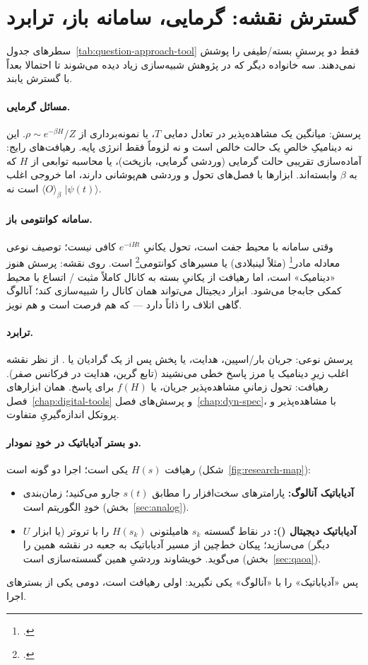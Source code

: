 \section{گسترش نقشه: گرمایی، سامانه باز، ترابرد}
\label{sec:map-extensions}

سطرهای جدول~\ref{tab:question-approach-tool} فقط دو پرسشِ بسته/طیفی را پوشش نمی‌دهند. سه خانواده دیگر که در پژوهش شبیه‌سازی زیاد دیده می‌شوند تا احتمالا بعداً با گسترش یابند.

\paragraph{مسائل گرمایی.}
پرسش: میانگین یک مشاهده‌پذیر در تعادل دمایی $T$، یا نمونه‌برداری از $\rho\sim e^{-\beta H}/Z$. این نه دینامیکِ خالصِ یک حالت خالص است و نه لزوماً فقط انرژی پایه. رهیافت‌های رایج: آماده‌سازی تقریبی حالت گرمایی (وردشی گرمایی، بازپخت)، یا محاسبه توابعی از $H$ که به $\beta$ وابسته‌اند. ابزارها با فصل‌های تحول و وردشی هم‌پوشانی دارند، اما خروجی اغلب $\langle O\rangle_\beta$ است نه $\lvert\psi(t)\rangle$.

\paragraph{سامانه کوانتومی باز.}
وقتی سامانه با محیط جفت است، تحول یکانیِ $e^{-iHt}$ کافی نیست؛ توصیف نوعی معادله مادر\footnote{.} (مثلاً لینبلادی) یا مسیرهای کوانتومی\footnote{.} است. روی نقشه: پرسش هنوز «دینامیک» است، اما رهیافت از یکانیِ بسته به کانال کاملاً مثبت / اتساع با محیط کمکی جابه‌جا می‌شود. ابزار دیجیتال می‌تواند همان کانال را شبیه‌سازی کند؛ آنالوگ گاهی اتلاف را ذاتاً دارد --- که هم فرصت است و هم نویز.

\paragraph{ترابرد.}
پرسش نوعی: جریان بار/اسپین، هدایت، یا پخش پس از یک گرادیان یا . از نظر نقشه اغلب زیرِ دینامیک یا مرز پاسخ خطی می‌نشیند (تابع گرین، هدایت در فرکانس صفر). رهیافت: تحول زمانیِ مشاهده‌پذیر جریان، یا $f(H)$ برای پاسخ. همان ابزارهای فصل~\ref{chap:digital-tools} و پرسش‌های فصل~\ref{chap:dyn-spec}، با مشاهده‌پذیر و پروتکل اندازه‌گیریِ متفاوت.

\paragraph{دو بستر آدیاباتیک در خودِ نمودار.}
رهیافت $H(s)$ یکی است؛ اجرا دو گونه است (شکل~\ref{fig:research-map}):
\begin{itemize}
	\item \textbf{آدیاباتیک آنالوگ:} پارامترهای سخت‌افزار را مطابق $s(t)$ جارو می‌کنید؛ زمان‌بندی خودِ الگوریتم است (بخش~\ref{sec:analog}).
	\item \textbf{آدیاباتیک دیجیتال ():} در نقاط گسسته $s_k$ هامیلتونی $H(s_k)$ را با تروتر (یا ابزار $U$ دیگر) می‌سازید؛ پیکان خط‌چین از مسیر آدیاباتیک به جعبه  در نقشه همین را می‌گوید.  خویشاوند وردشیِ همین گسسته‌سازی است (بخش~\ref{sec:qaoa}).
\end{itemize}
پس «آدیاباتیک» را با «آنالوگ» یکی نگیرید: اولی رهیافت است، دومی یکی از بسترهای اجرا.


